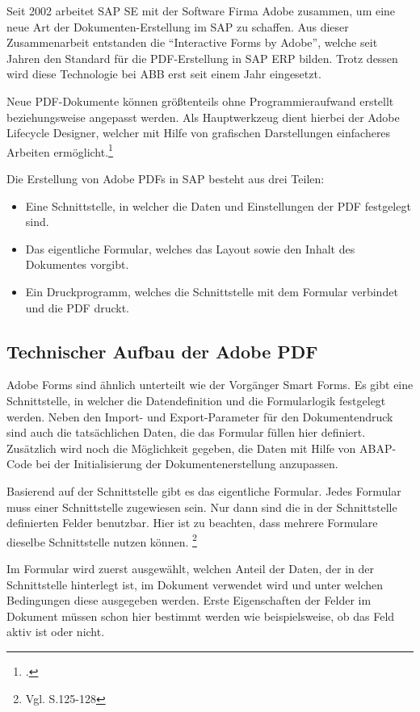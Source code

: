 Seit 2002 arbeitet SAP SE mit der Software Firma Adobe zusammen, um eine neue Art der Dokumenten-Erstellung im SAP zu schaffen. Aus dieser Zusammenarbeit entstanden die "`Interactive Forms by Adobe"', welche seit Jahren den Standard für die PDF-Erstellung in SAP ERP bilden. Trotz dessen wird diese Technologie bei ABB erst seit einem Jahr eingesetzt.

Neue \ac{PDF}-Dokumente können größtenteils ohne Programmieraufwand erstellt beziehungsweise angepasst werden. Als Hauptwerkzeug dient hierbei der Adobe Lifecycle Designer, welcher mit Hilfe von grafischen Darstellungen einfacheres Arbeiten ermöglicht.\footcite{Bahr.2016}

Die Erstellung von Adobe \ac{PDF}s in SAP besteht aus drei Teilen:

\begin{itemize}
	\item Eine Schnittstelle, in welcher die Daten und Einstellungen der PDF festgelegt sind.
	\item Das eigentliche Formular, welches das Layout sowie den Inhalt des Dokumentes vorgibt.
	\item Ein Druckprogramm, welches die Schnittstelle mit dem Formular verbindet und die PDF druckt.
\end{itemize}

\subsection{Technischer Aufbau der Adobe PDF}
\label{ch:Schnittstelle}

Adobe Forms sind ähnlich unterteilt wie der Vorgänger Smart Forms. Es gibt eine Schnittstelle, in welcher die Datendefinition und die Formularlogik festgelegt werden. Neben den Import- und Export-Parameter für den Dokumentendruck sind auch die tatsächlichen Daten, die das Formular füllen hier definiert. Zusätzlich wird noch die Möglichkeit gegeben, die Daten mit Hilfe von \ac{ABAP}-Code bei der Initialisierung der Dokumentenerstellung anzupassen.

Basierend auf der Schnittstelle gibt es das eigentliche Formular. Jedes Formular muss einer Schnittstelle zugewiesen sein. Nur dann sind die in der Schnittstelle definierten Felder benutzbar. Hier ist zu beachten, dass mehrere Formulare dieselbe Schnittstelle nutzen können. \footnote{Vgl. \cite{Hauser.2015} S.125-128} 

Im Formular wird zuerst ausgewählt, welchen Anteil der Daten, der in der Schnittstelle hinterlegt ist, im Dokument verwendet wird und unter welchen Bedingungen diese ausgegeben werden. Erste Eigenschaften der Felder im Dokument müssen schon hier bestimmt werden wie beispielsweise, ob das Feld aktiv ist oder nicht.



